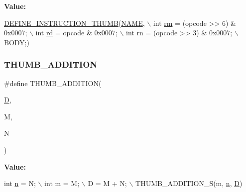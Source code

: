 {\bfseries Value\+:}
\begin{DoxyCode}
\mbox{\hyperlink{isa-thumb_8c_aca0a4c9b536fe9f14f89105945cfeb3d}{DEFINE\_INSTRUCTION\_THUMB}}(\mbox{\hyperlink{inflate_8h_a164ea0159d5f0b5f12a646f25f99eceaa67bc2ced260a8e43805d2480a785d312}{NAME}}, \(\backslash\)
        \textcolor{keywordtype}{int} \mbox{\hyperlink{isa-thumb_8c_a20e40d2fb8c51fa4dd2b4449ad32e111}{rm}} = (opcode >> 6) & 0x0007; \(\backslash\)
        int \mbox{\hyperlink{isa-arm_8c_a555541ce18ed9b5fad657a06b22cb465}{rd}} = opcode & 0x0007; \(\backslash\)
        int rn = (opcode >> 3) & 0x0007; \(\backslash\)
        BODY;)
\end{DoxyCode}
\mbox{\label{isa-thumb_8c_ad793558cdf582a81560be39e66738aa7}} 
\subsubsection{\texorpdfstring{T\+H\+U\+M\+B\+\_\+\+A\+D\+D\+I\+T\+I\+ON}{THUMB\_ADDITION}}
{\footnotesize\ttfamily \#define T\+H\+U\+M\+B\+\_\+\+A\+D\+D\+I\+T\+I\+ON(\begin{DoxyParamCaption}\item[{}]{\mbox{\hyperlink{_aes_8c_adef282f11138cda3d081cc21280a8d12}{D}},  }\item[{}]{M,  }\item[{}]{N }\end{DoxyParamCaption})}

{\bfseries Value\+:}
\begin{DoxyCode}
\textcolor{keywordtype}{int} \mbox{\hyperlink{isa-thumb_8c_a76f11d9a0a47b94f72c2d0e77fb32240}{n}} = N; \(\backslash\)
    int m = M; \(\backslash\)
    D = M + N; \(\backslash\)
    THUMB\_ADDITION\_S(m, \mbox{\hyperlink{isa-thumb_8c_a76f11d9a0a47b94f72c2d0e77fb32240}{n}}, \mbox{\hyperlink{_aes_8c_adef282f11138cda3d081cc21280a8d12}{D}})
\end{DoxyCode}
\mbox{\label{isa-thumb_8c_a9f1a491535a7a9979d9a32cc97feb29b}} 
